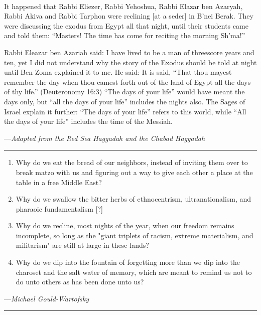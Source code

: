 \documentclass[a4paper,10pt,openany]{memoir}
\newcommand{\HgSource}[1]{\hfill{\small---\itshape{#1}}}
\newcommand{\HgFill}{\vfill \hrule \vfill}
\newenvironment{HgEnglish}{\strut\\\noindent}{\vspace{1em}}
\begin{document}
\begin{HgEnglish}
It happened that Rabbi Eliezer, Rabbi Yehoshua, Rabbi Elazar ben Azaryah, Rabbi
Akiva and Rabbi Tarphon were reclining [at a seder] in B'nei Berak. They were
discussing the exodus from Egypt all that night, until their students came and
told them: ``Masters! The time has come for reciting the morning Sh'ma!''

Rabbi Eleazar ben Azariah said: I have lived to be a man of threescore years and
ten, yet I did not understand why the story of the Exodus should be told at
night until Ben Zoma explained it to me. He said: It is said, ``That thou mayest
remember the day when thou camest forth out of the land of Egypt all the days of
thy life.'' (Deuteronomy 16:3) ``The days of your life'' would have meant the
days only, but ``all the days of your life'' includes the nights also.  The
Sages of Israel explain it further: ``The days of your life'' refers to this
world, while ``All the days of your life'' includes the time of the Messiah.

\HgSource{Adapted from the Red Sea Haggadah and the Chabad Haggadah}
\end{HgEnglish}

\HgFill

\begin{enumerate}
  \item
    Why do we eat the bread of our neighbors, instead of inviting them over to
    break matzo with us and figuring out a way to give each other a place at the
    table in a free Middle East?

  \item
    Why do we swallow the bitter herbs of ethnocentrism, ultranationalism, and
    pharaoic fundamentalism [?]

  \item
    Why do we recline, most nights of the year, when our freedom remains
    incomplete, so long as the "giant triplets of racism, extreme materialism,
    and militarism" are still at large in these lands?

  \item
    Why do we dip into the fountain of forgetting more than we dip into the
    charoset and the salt water of memory, which are meant to remind us not to
    do unto others as has been done unto us?
\end{enumerate}
\HgSource{Michael Gould-Wartofsky}\\

\HgFill
\end{document}
